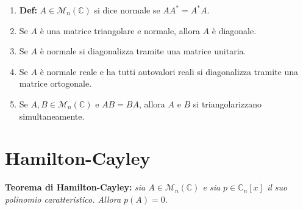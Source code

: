\documentclass[a4paper,11pt]{article}
\newcommand{\agg}[1]{#1^*}							%
\begin{document}
\begin{enumerate}[resume]
	\item\textbf{Def:} $A\in\mathcal{M}_n(\mathbb{C})$ si dice normale se $A\agg{A}=\agg{A}A$.
	\item Se $A$ è una matrice triangolare e normale, allora $A$ è diagonale.
	\item Se $A$ è normale si diagonalizza tramite una matrice unitaria.
	\item Se $A$ è normale reale e ha tutti autovalori reali si diagonalizza tramite una matrice ortogonale.
	\item Se $A,B\in\mathcal{M}_n(\mathbb{C})$ e $AB=BA$, allora $A$ e $B$ si triangolarizzano simultaneamente.
\end{enumerate}
\section{Hamilton-Cayley}
\textbf{Teorema di Hamilton-Cayley:} \textit{sia $A\in\mathcal{M}_n(\mathbb{C})$ e sia $p\in\mathbb{C}_n[x]$ il suo polinomio caratteristico. Allora $p(A)=0$.}
\end{document}
